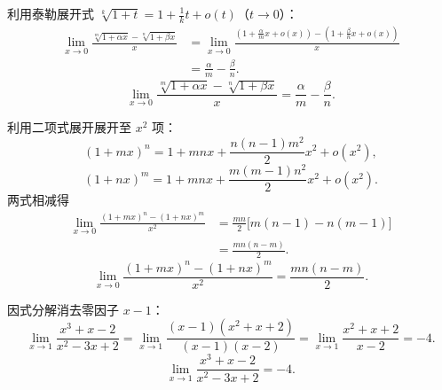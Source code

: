 \begin{solution}

    利用泰勒展开式 $\sqrt[k]{1 + t} = 1 + \frac{1}{k}t + o(t)$（$t \to 0$）：
    \begin{equation}
        \begin{aligned}
            \lim_{x\to 0} \frac{\sqrt[m]{1+\alpha x} - \sqrt[n]{1+\beta x}}{x} & = \lim_{x\to 0} \frac{\left( 1 + \frac{\alpha}{m}x + o(x) \right) - \left( 1 + \frac{\beta}{n}x + o(x) \right)}{x} \\
                                                                               & = \frac{\alpha}{m} - \frac{\beta}{n}.
        \end{aligned}
    \end{equation}
    \begin{equation}
        \boxed{\lim_{x\to 0} \frac{\sqrt[m]{1+\alpha x} - \sqrt[n]{1+\beta x}}{x} = \frac{\alpha}{m} - \frac{\beta}{n}.}
    \end{equation}


    利用二项式展开展开至 $x^2$ 项：
    \begin{equation}
        (1+mx)^n = 1 + mnx + \frac{n(n-1)m^2}{2}x^2 + o(x^2),
    \end{equation}
    \begin{equation}
        (1+nx)^m = 1 + mnx + \frac{m(m-1)n^2}{2}x^2 + o(x^2).
    \end{equation}
    两式相减得
    \begin{equation}
        \begin{aligned}
            \lim_{x\to 0} \frac{(1+mx)^n - (1+nx)^m}{x^2} & = \frac{mn}{2}\bigl[ m(n-1) - n(m-1) \bigr] \\
                                                          & = \frac{mn(n-m)}{2}.
        \end{aligned}
    \end{equation}
    \begin{equation}
        \boxed{\lim_{x\to 0} \frac{(1+mx)^n - (1+nx)^m}{x^2} = \frac{mn(n-m)}{2}.}
    \end{equation}


    因式分解消去零因子 $x - 1$：
    \begin{equation}
        \lim_{x\to 1} \frac{x^3 + x - 2}{x^2 - 3x + 2} = \lim_{x\to 1} \frac{(x-1)(x^2 + x + 2)}{(x-1)(x-2)} = \lim_{x\to 1} \frac{x^2 + x + 2}{x - 2} = -4.
    \end{equation}
    \begin{equation}
        \boxed{\lim_{x\to 1} \frac{x^3 + x - 2}{x^2 - 3x + 2} = -4.}
    \end{equation}


\end{solution}
